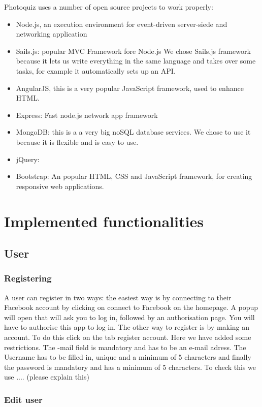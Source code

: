 \documentclass[11pt, oneside]{article}   	%
\begin{document}
Photoquiz uses a number of open source projects to work properly:
\begin{itemize}
\item Node.js, an execution environment for event-driven server-siede and networking application
\item Sails.js: popular MVC Framework fore Node.js We chose Sails.js framework because it lets us write everything in the same language and takes over some tasks, for example it automatically sets up an API.
\item AngularJS, this is a very popular JavaScript framework, used to enhance HTML.
\item Express: Fast node.js network app framework
\item MongoDB: this is a a very big noSQL database services. We chose to use it because it is flexible and is easy to use.
\item jQuery: 
\item Bootstrap: An popular HTML, CSS and JavaScript framework, for creating responsive web applications. 
\end{itemize}



\section{Implemented functionalities}
\subsection{User}
\subsubsection{Registering}

A user can register in two ways: the easiest way is by connecting to their Facebook account by clicking on connect to Facebook on the homepage. A popup will open that will ask you to log in, followed by an authorisation page. You will have to authorise this app to log-in.
The other way to register is by making an account. To do this click on the tab register account. Here we have added some restrictions. The -mail field is mandatory and has to be an e-mail adress. The Username has to be filled in, unique and a minimum of 5 characters and finally the password is mandatory and has a minimum of 5 characters.
To check this we use .... (please explain this) \\

\subsubsection{Edit user}
\end{document}
